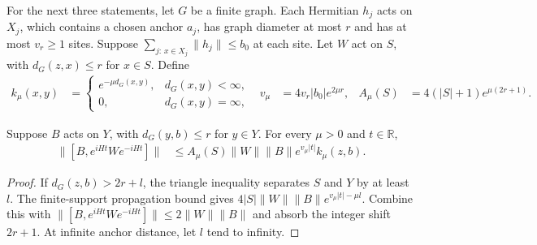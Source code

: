 For the next three statements, let $G$ be a finite graph. Each Hermitian
$h_j$ acts on $X_j$, which contains a chosen anchor $a_j$, has graph
diameter at most $r$ and has at most $v_r\ge1$ sites. Suppose
$\sum_{j:\,x\in X_j}\|h_j\|\le b_0$ at each site. Let $W$ act on $S$,
with $d_G(z,x)\le r$ for $x\in S$. Define
\begin{align}
    k_\mu(x,y) & =
    \begin{cases}e^{-\mu d_G(x,y)}, & d_G(x,y)<\infty, \\
             0,                 & d_G(x,y)=\infty,\end{cases}
               & v_\mu    & =4v_r|b_0|e^{2\mu r},
               & A_\mu(S) & =4(|S|+1)e^{\mu(2r+1)}.
    \label{eq:hastings05_anchor_lr_constants}
\end{align}

\begin{lemma}
    \label{thm:hastings05_anchor_lr}
    \leanok
    Suppose $B$ acts on $Y$, with $d_G(y,b)\le r$ for $y\in Y$.
    For every $\mu>0$ and $t\in\mathbb R$,
    \begin{align}
        \|[B,e^{iHt}We^{-iHt}]\|
         & \le A_\mu(S)\|W\|\|B\|e^{v_\mu|t|}k_\mu(z,b).
        \label{eq:hastings05_anchor_lr}
    \end{align}
\end{lemma}
\begin{proof}\leanok
    If $d_G(z,b)>2r+l$, the triangle inequality separates $S$ and $Y$
    by at least $l$. The finite-support propagation bound gives
    $4|S|\|W\|\|B\|e^{v_\mu|t|-\mu l}$. Combine this with
    $\|[B,e^{iHt}We^{-iHt}]\|\le2\|W\|\|B\|$ and absorb the integer
    shift $2r+1$. At infinite anchor distance, let $l$ tend to infinity.
\end{proof}

